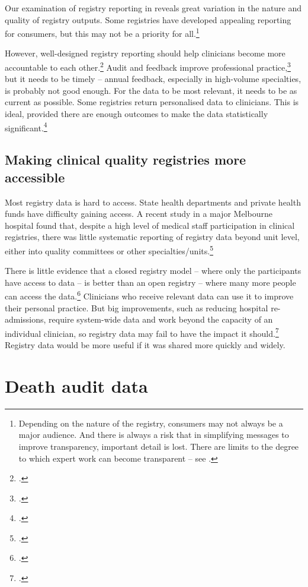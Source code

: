 \documentclass[FrontPage]{grattan}
\begin{document}
Our examination of registry reporting in  reveals great variation in the nature and quality of registry outputs. Some registries have developed appealing reporting for consumers, but this may not be a priority for all.\footnote{Depending on the nature of the registry, consumers may not always be a major audience. And there is always a risk that in simplifying messages to improve transparency, important detail is lost. There are limits to the degree to which expert work can become transparent -- see \textcite{RN37}.}

However, well-designed registry reporting should help clinicians become more accountable to each other.\footcite{RN38}
Audit and feedback improve professional practice,\footcite{RN39}
but it needs to be timely -- annual feedback, especially in high-volume specialties, is probably not good enough. For the data to be most relevant, it needs to be as current as possible. Some registries return personalised data to clinicians. This is ideal, provided there are enough outcomes to make the data statistically significant.\footcites{RN41}{ahern2017registries}

\subsection{Making clinical quality registries more accessible}\label{subsec:registriesaccess}
Most registry data is hard to access. State health departments and private health funds have difficulty gaining access. A recent study in a major Melbourne hospital found that, despite a high level of medical staff participation in clinical registries, there was little systematic reporting of registry data beyond unit level, either into quality committees or other specialties/units.\footcite{RN30}

There is little evidence that a closed registry model -- where only the participants have access to data -- is better than an open registry -- where many more people can access the data.\footcite{RN121}
Clinicians who receive relevant data can use it to improve their personal practice. But big improvements, such as reducing hospital re-admissions, require system-wide data and work beyond the capacity of an individual clinician, so registry data may fail to have the impact it should.\footcite{RN38} Registry data would be more useful if it was shared more quickly and widely.



\section{Death audit data}\label{sec:death}
\end{document}
